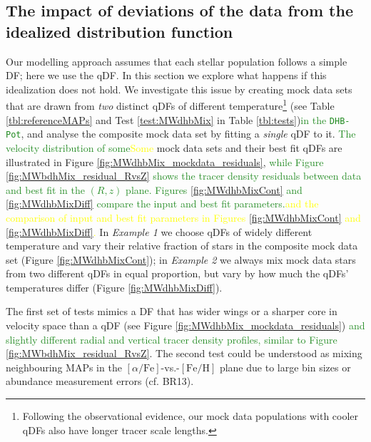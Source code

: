 \documentclass[iop,revtex4,numberedappendix,appendixfloats]{emulateapj}
\newcommand{\MAPs}{MAPs}
\newcommand{\NEW}[1]{\textcolor{ForestGreen}{#1}}
\newcommand{\OLD}[1]{\textcolor{Yellow}{#1}}%
\begin{document}
\subsection{The impact of deviations of the data from the idealized distribution function} \label{sec:results_mixedDFs}

Our modelling approach assumes that each stellar population follows a simple DF; here we use the qDF. In this section we explore what happens if this idealization does not hold. We investigate this issue by creating mock data sets that are drawn from \emph{two} distinct qDFs of different temperature\footnote{Following the observational evidence, our mock data populations with cooler qDFs also have longer tracer scale lengths.} (see Table \ref{tbl:referenceMAPs} and Test \ref{test:MWdhbMix} in Table \ref{tbl:tests})\NEW{in the \texttt{DHB-Pot}}, and analyse the composite mock data set by fitting a \emph{single} qDF to it. \NEW{The velocity distribution of some}\OLD{Some} mock data sets and their best fit qDFs are illustrated in Figure \ref{fig:MWdhbMix_mockdata_residuals}, \NEW{while Figure \ref{fig:MWbdhMix_residual_RvsZ} shows the tracer density residuals between data and best fit in the $(R,z)$ plane. Figures \ref{fig:MWdhbMixCont} and \ref{fig:MWdhbMixDiff} compare the input and best fit parameters.}\OLD{and the comparison of input and best fit parameters in Figures \ref{fig:MWdhbMixCont} and \ref{fig:MWdhbMixDiff}.} In \emph{Example 1} we choose qDFs of widely different temperature and vary their relative fraction of stars in the composite mock data set (Figure \ref{fig:MWdhbMixCont}); in \emph{Example 2} we always mix mock data stars from two different qDFs in equal proportion, but vary by how much the qDFs' temperatures differ (Figure \ref{fig:MWdhbMixDiff}). 

The first set of tests mimics a DF that has wider wings or a sharper core in velocity space than a qDF (see Figure \ref{fig:MWdhbMix_mockdata_residuals}) \NEW{and slightly different radial and vertical tracer density profiles, similar to Figure \ref{fig:MWbdhMix_residual_RvsZ}}. The second test could be understood as mixing neighbouring \MAPs{} in the $[\alpha/\mathrm{Fe}]$-vs.-$[\mathrm{Fe}/\mathrm{H}]$ plane due to large bin sizes or abundance measurement errors (cf. BR13). 
\end{document}
